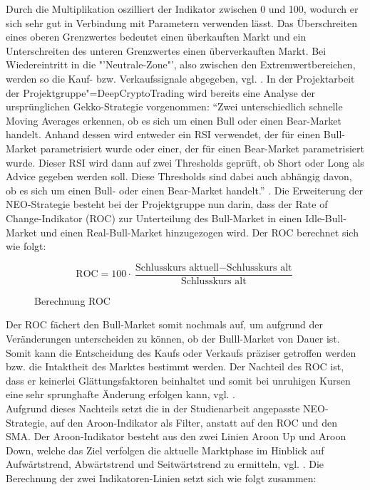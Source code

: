 Durch die Multiplikation oszilliert der Indikator zwischen 0 und 100, wodurch er sich sehr gut in Verbindung mit Parametern verwenden lässt. Das Überschreiten eines oberen Grenzwertes bedeutet einen überkauften Markt und ein Unterschreiten des unteren Grenzwertes einen überverkauften Markt. Bei Wiedereintritt in die "'Neutrale-Zone"', also zwischen den Extremwertbereichen, werden so die Kauf- bzw. Verkaufssignale abgegeben, vgl. \cite{ber20}. In der Projektarbeit der Projektgruppe"=DeepCryptoTrading wird bereits eine Analyse der ursprünglichen Gekko-Strategie vorgenommen: "`Zwei unterschiedlich schnelle Moving Averages erkennen, ob es sich um einen Bull oder einen Bear-Market handelt. Anhand dessen wird entweder ein RSI verwendet, der für einen Bull-Market parametrisiert wurde oder einer, der für einen Bear-Market parametrisiert wurde. Dieser RSI wird dann auf zwei Thresholds geprüft, ob Short oder Long als Advice gegeben werden soll. Diese Thresholds sind dabei auch abhängig davon, ob es sich um einen Bull- oder einen Bear-Market handelt."' \cite{pro19}. Die Erweiterung der NEO-Strategie besteht bei der Projektgruppe nun darin, dass der Rate of Change-Indikator (ROC) zur Unterteilung des Bull-Market in einen Idle-Bull-Market und einen Real-Bull-Market hinzugezogen wird. Der ROC berechnet sich wie folgt: \\ 

\begin{figure}
\begin{equation}
\text{ROC}=100\cdot\frac{\text{Schlusskurs aktuell}- \text{Schlusskurs alt}}{\text{Schlusskurs alt}}
\end{equation}
\caption{Berechnung ROC}
\end{figure}


Der ROC fächert den Bull-Market somit nochmals auf, um aufgrund der Veränderungen unterscheiden zu können, ob der Bulll-Market von Dauer ist. Somit kann die Entscheidung des Kaufs oder Verkaufs präziser getroffen werden bzw. die Intaktheit des Marktes bestimmt werden. Der Nachteil des ROC ist, dass er keinerlei Glättungsfaktoren beinhaltet und somit bei unruhigen Kursen eine sehr sprunghafte Änderung erfolgen kann, vgl. \cite{tra20}.\\

Aufgrund dieses Nachteils setzt die in der Studienarbeit angepasste NEO-Strategie, auf den Aroon-Indikator als Filter, anstatt auf den ROC und den SMA. Der Aroon-Indikator besteht aus den zwei Linien Aroon Up und Aroon Down, welche das Ziel verfolgen die aktuelle Marktphase im Hinblick auf Aufwärtstrend, Abwärtstrend und Seitwärtstrend zu ermitteln, vgl. \cite{ber201}. Die Berechnung der zwei Indikatoren-Linien setzt sich wie folgt zusammen: \\

